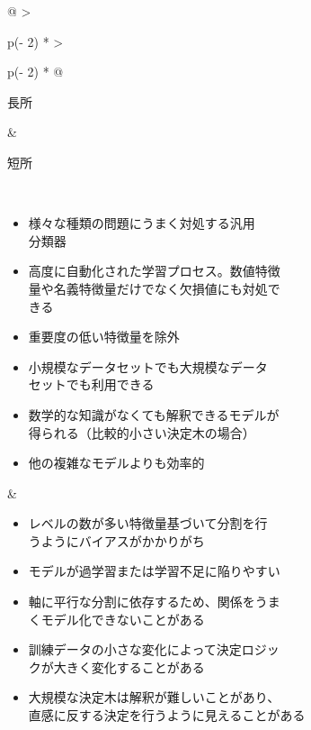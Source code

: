 \documentclass[
]{article}
\providecommand{\tightlist}{%
  \setlength{\itemsep}{0pt}\setlength{\parskip}{0pt}}
\begin{document}
\begin{longtable}[]{@{}
  >{\raggedright\arraybackslash}p{(\columnwidth - 2\tabcolsep) * }
  >{\raggedright\arraybackslash}p{(\columnwidth - 2\tabcolsep) * }@{}}
\toprule\noalign{}
\begin{minipage}[b]{\linewidth}\raggedright
長所
\end{minipage} & \begin{minipage}[b]{\linewidth}\raggedright
短所
\end{minipage} \\
\midrule\noalign{}
\endhead
\bottomrule\noalign{}
\endlastfoot
\begin{minipage}[t]{\linewidth}\raggedright
\begin{itemize}
\item
  様々な種類の問題にうまく対処する汎用\\
  分類器
\item
  高度に自動化された学習プロセス。数値特徴\\
  量や名義特徴量だけでなく欠損値にも対処で\\
  きる
\item
  重要度の低い特徴量を除外
\item
  小規模なデータセットでも大規模なデータ\\
  セットでも利用できる
\item
  数学的な知識がなくても解釈できるモデルが\\
  得られる（比較的小さい決定木の場合）
\item
  他の複雑なモデルよりも効率的
\end{itemize}\strut
\end{minipage} & \begin{minipage}[t]{\linewidth}\raggedright
\begin{itemize}
\tightlist
\item
  レベルの数が多い特徴量基づいて分割を行\\
  うようにバイアスがかかりがち
\item
  モデルが過学習または学習不足に陥りやすい
\item
  軸に平行な分割に依存するため、関係をうま\\
  くモデル化できないことがある
\item
  訓練データの小さな変化によって決定ロジッ\\
  クが大きく変化することがある
\item
  大規模な決定木は解釈が難しいことがあり、\\
  直感に反する決定を行うように見えることがある
\end{itemize}\strut
\end{minipage} \\
\end{longtable}
\end{document}
